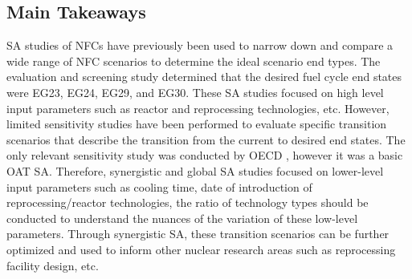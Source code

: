 \subsection{Main Takeaways}
\gls{SA} studies of \glspl{NFC} have previously been used to narrow 
down and compare a wide range of \gls{NFC} scenarios to determine 
the ideal scenario end types. 
The evaluation and screening study determined that the desired 
fuel cycle end states were EG23, EG24, EG29, and EG30.
These \gls{SA} studies focused on high level input 
parameters such as reactor and reprocessing technologies, etc.
However, limited sensitivity studies have been performed to 
evaluate specific transition scenarios that describe the transition 
from the current to desired end states.
The only relevant sensitivity study was conducted by OECD 
\cite{noauthor_effects_2017}, however it was a basic OAT 
\gls{SA}.   
Therefore, synergistic and global \gls{SA} studies focused on
lower-level input parameters such as cooling time, 
date of introduction of reprocessing/reactor 
technologies, the ratio of technology types should be conducted to 
understand the nuances of the variation of these low-level parameters. 
Through synergistic \gls{SA}, these transition scenarios can be 
further optimized and used to inform other nuclear research areas 
such as reprocessing facility design, etc. 